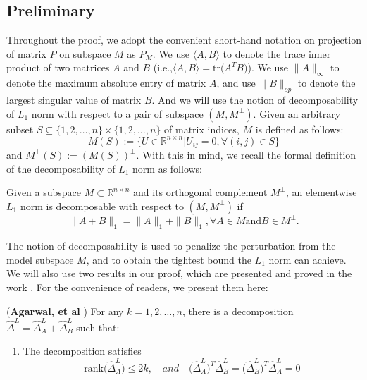\documentclass[AMS,STIX1COL]{WileyNJD-v2}
\begin{document}
{\subsection{Preliminary} \label{App:Pre}
Throughout the proof, we adopt the convenient short-hand notation on projection of matrix $P$ on subspace $M$ as $P_{M}$.
We use $\langle A,B \rangle$ to denote the trace inner product of two matrices $A$ and $B$ \big(i.e.,$\langle A,B \rangle=\mbox{tr}\big(A^T B\big)$\big).
We use $\|A\|_{\infty}$ to denote the maximum absolute entry of matrix $A$, and use $\|B\|_{op}$ to denote the largest singular value of matrix $B$.
And we will use the notion of decomposability of $L_1$ norm with respect to a pair of subspace $(M,M^{\perp})$.
Given an arbitrary subset $S \subseteq \{1,2,\dots,n\} \times \{1,2,\dots,n\}$ of matrix indices, $M$ is defined as follows:
\[
    M(S):=\{ U \in \mathbb{R}^{n \times n} | U_{ij}=0, \forall (i,j) \in S \}
\]
and $M^{\perp}(S):=(M(S))^{\perp}$.
With this in mind, we recall the formal definition of the decomposability of $L_1$ norm as follows:
\begin{definition}
    Given a subspace $M \subset \mathbb{R}^{n \times n}$ and its orthogonal complement $M^{\perp}$, an elementwise $L_1$ norm
    is decomposable with respect to $(M, M^{\perp})$ if
    \[
        \| A + B \|_{1} = \|A\|_{1} + \|B\|_{1},
        \forall A \in M \mbox{and} B \in M^{\perp}.
    \]
\end{definition}
The notion of decomposability is used to penalize the perturbation from the model subspace $M$, and to obtain the tightest bound the $L_1$ norm can achieve.
We will also use two results in our proof, which are presented and proved in the work \cite{agarwal2012noisy}.
For the convenience of readers, we present them here:
\begin{lemma} \label{eq:Lmag}
(\textbf{Agarwal, et al} \cite{agarwal2012noisy})
For any $k=1,2,\dots,n$, there is a decomposition $\widehat{\Delta}^{L} =\widehat{\Delta}^{L}_{A} + \widehat{\Delta}^{L}_{B}$ such that:
\begin{enumerate}
 \item The decomposition satisfies
    \begin{equation}\label{eq:Lm1}
        \mbox{rank}\big(\widehat{\Delta}^{L}_{A}\big) \leq 2k, \quad and \quad \big(\widehat{\Delta}^{L}_{A}\big)^{T}\widehat{\Delta}^{L}_{B}
        = \big(\widehat{\Delta}^{L}_{B}\big)^{T}\widehat{\Delta}^{L}_{A} =0

\end{equation}
\end{enumerate}
\end{lemma}}
\end{document}
